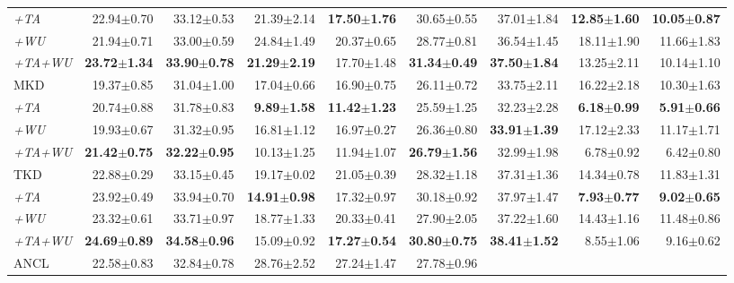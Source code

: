 \begin{appendix}
\begin{table*}[!th]
{\begin{tabular}{lrrrrrrrr}
\textit{+TA} &
  22.94$\pm$0.70 &
  33.12$\pm$0.53 &
  21.39$\pm$2.14 &
  \textbf{17.50$\pm$1.76} &
  30.65$\pm$0.55 &
  37.01$\pm$1.84 &
  \textbf{12.85$\pm$1.60} &
  \textbf{10.05$\pm$0.87} \\
\textit{+WU} &
  21.94$\pm$0.71 &
  33.00$\pm$0.59 &
  24.84$\pm$1.49 &
  20.37$\pm$0.65 &
  28.77$\pm$0.81 &
  36.54$\pm$1.45 &
  18.11$\pm$1.90 &
  11.66$\pm$1.83 \\
\textit{+TA+WU} &
  \textbf{23.72$\pm$1.34} &
  \textbf{33.90$\pm$0.78} &
  \textbf{21.29$\pm$2.19} &
  17.70$\pm$1.48 &
  \textbf{31.34$\pm$0.49} &
  \textbf{37.50$\pm$1.84} &
  13.25$\pm$2.11 &
  10.14$\pm$1.10 \\ \midrule
MKD &
  19.37$\pm$0.85 &
  31.04$\pm$1.00 &
  17.04$\pm$0.66 &
  16.90$\pm$0.75 &
  26.11$\pm$0.72 &
  33.75$\pm$2.11 &
  16.22$\pm$2.18 &
  10.30$\pm$1.63 \\
\textit{+TA} &
  20.74$\pm$0.88 &
  31.78$\pm$0.83 &
  \textbf{9.89$\pm$1.58} &
  \textbf{11.42$\pm$1.23} &
  25.59$\pm$1.25 &
  32.23$\pm$2.28 &
  \textbf{6.18$\pm$0.99} &
  \textbf{5.91$\pm$0.66} \\
\textit{+WU} &
  19.93$\pm$0.67 &
  31.32$\pm$0.95 &
  16.81$\pm$1.12 &
  16.97$\pm$0.27 &
  26.36$\pm$0.80 &
  \textbf{33.91$\pm$1.39} &
  17.12$\pm$2.33 &
  11.17$\pm$1.71 \\
\textit{+TA+WU} &
  \textbf{21.42$\pm$0.75} &
  \textbf{32.22$\pm$0.95} &
  10.13$\pm$1.25 &
  11.94$\pm$1.07 &
  \textbf{26.79$\pm$1.56} &
  32.99$\pm$1.98 &
  6.78$\pm$0.92 &
  6.42$\pm$0.80 \\ \midrule
TKD &
  22.88$\pm$0.29 &
  33.15$\pm$0.45 &
  19.17$\pm$0.02 &
  21.05$\pm$0.39 &
  28.32$\pm$1.18 &
  37.31$\pm$1.36 &
  14.34$\pm$0.78 &
  11.83$\pm$1.31 \\
\textit{+TA} &
  23.92$\pm$0.49 &
  33.94$\pm$0.70 &
  \textbf{14.91$\pm$0.98} &
  17.32$\pm$0.97 &
  30.18$\pm$0.92 &
  37.97$\pm$1.47 &
  \textbf{7.93$\pm$0.77} &
  \textbf{9.02$\pm$0.65} \\
\textit{+WU} &
  23.32$\pm$0.61 &
  33.71$\pm$0.97 &
  18.77$\pm$1.33 &
  20.33$\pm$0.41 &
  27.90$\pm$2.05 &
  37.22$\pm$1.60 &
  14.43$\pm$1.16 &
  11.48$\pm$0.86 \\
\textit{+TA+WU} &
  \textbf{24.69$\pm$0.89} &
  \textbf{34.58$\pm$0.96} &
  15.09$\pm$0.92 &
  \textbf{17.27$\pm$0.54} &
  \textbf{30.80$\pm$0.75} &
  \textbf{38.41$\pm$1.52} &
  8.55$\pm$1.06 &
  9.16$\pm$0.62 \\ \midrule
ANCL &
  22.58$\pm$0.83 &
  32.84$\pm$0.78 &
  28.76$\pm$2.52 &
  27.24$\pm$1.47 &
  27.78$\pm$0.96 &

\end{tabular}}
\end{table*}
\end{appendix}
